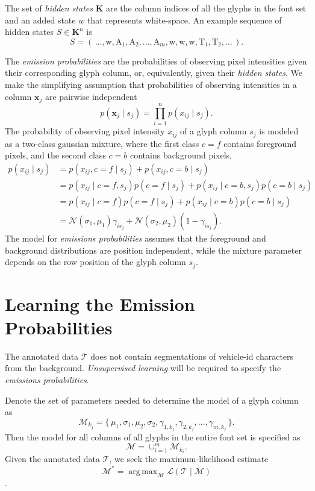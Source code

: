 \documentclass[a4paper,12pt]{article}
\newcommand{\lhood}{\ensuremath{\mathcal{L}}}
\newcommand{\truth}{\ensuremath{\mathcal{T}}}
\newcommand{\model}{\ensuremath{\mathcal{M}}}
\newcommand{\optmodel}{\ensuremath{\mathcal{M}^*}}
\DeclareMathOperator*{\argmax}{arg\,max}
\begin{document}
The set of \emph{hidden states} $\mathbf{K}$ are the column indices of
all the glyphs in the font set and an added state $w$ that represents
white-space. An example sequence of hidden states $S \in \mathbf{K}^n$
is
\[S =
\left(\,\dots,\text{w},\text{A}_1,\text{A}_2,\ldots,\text{A}_{m},\text{w},\text{w},\text{w},\text{T}_1,\text{T}_2,\ldots\,\right).\]

The \emph{emission probabilities} are the probabilities of observing
pixel intensities given their corresponding glyph column, or,
equivalently, given their \emph{hidden states}. We make the
simplifying assumption that probabilities of observing intensities in
a column $\mathbf{x}_j$ are pairwise independent \[p(\mathbf{x}_j \mid
s_j) = \prod_{i=1}^np(x_{ij} \mid s_j).\] The probability of observing
pixel intensity $x_{ij}$ of a glyph column $s_j$ is modeled as a
two-class gaussian mixture, where the first class $c=f$ contains
foreground pixels, and the second class $c=b$ contains background
pixels,
\begin{align*}
  p(x_{ij} \mid s_j) &= p(x_{ij},c=f \mid s_j)+p(x_{ij},c=b \mid s_j)\\
  &= p(x_{ij}\mid c=f,s_j)p(c=f \mid s_j)+p(x_{ij} \mid c=b,s_j)p(c=b \mid s_j) \\
  &= p(x_{ij}\mid c=f)p(c=f \mid s_j)+p(x_{ij} \mid c=b)p(c=b \mid s_j) \\
  &= \mathcal{N}(\sigma_1,\mu_1)\gamma_{is_j}+\mathcal{N}(\sigma_2,\mu_2)(1-\gamma_{is_j}).
\end{align*}
The model for \emph{emissions probabilities} assumes that the
foreground and background distributions are position independent,
while the mixture parameter depends on the row position of the glyph
column $s_j$.

\section{Learning the Emission Probabilities}
The annotated data $\truth$ does not contain segmentations of
vehicle-id characters from the background.  \emph{Unsupervised
  learning} will be required to specify the \emph{emissions
  probabilities}.  

Denote the set of parameters needed to determine the model of a glyph
column as
\[\model_{k_j}=\{\,\mu_1,\sigma_1,\mu_2,\sigma_2,\gamma_{1,k_j},\gamma_{2,k_j},\ldots,\gamma_{m,k_j}\,\}.\]
Then the model for all columns of all glyphs in the entire font set is
specified as
\[
\model = \cup_{i=1}^m\model_{k_i}.
\]
Given the annotated data $\truth$, we seek the maximum-likelihood
estimate \[ \optmodel = \argmax_{\model} \lhood(\truth \mid \model)\].
\end{document}
